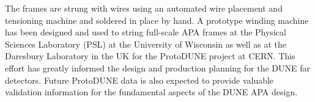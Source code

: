 The frames are strung with wires using an automated wire placement and tensioning machine and soldered in place by hand.  A prototype winding machine has been designed and used to string full-scale APA frames at the Physical Sciences Laboratory (PSL) at the University of Wisconsin as well as at the Daresbury Laboratory in the UK for the ProtoDUNE project at CERN. This effort has greatly informed the design and production planning for the DUNE far detectors. %
Future ProtoDUNE data is also expected to provide valuable validation information for the fundamental aspects of the DUNE APA design.







